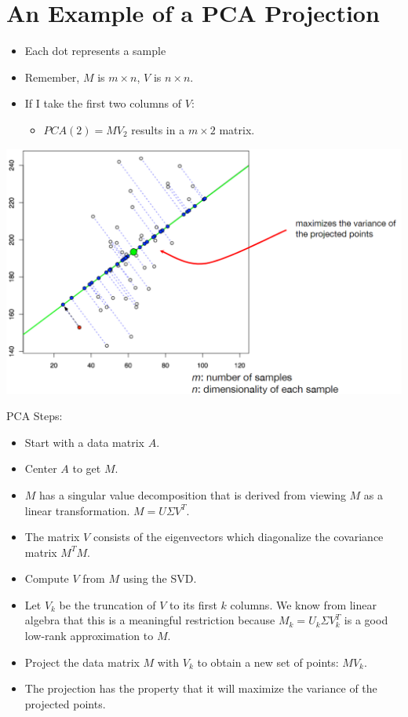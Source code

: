 \documentclass[10pt]{article}
\begin{document}
\section*{An Example of a PCA Projection}
\begin{itemize}
    \item Each dot represents a sample
    \item Remember, $M$ is $m \times n$, $V$ is $n \times n$.
    \item If I take the first two columns of $V$:
    \begin{itemize}
        \item $PCA(2) = MV_2$ results in a $m \times 2$ matrix.
    \end{itemize}
\end{itemize}
\begin{center}
    \includegraphics*[scale=0.65]{W8_2.png}
\end{center}
PCA Steps:
\begin{itemize}
    \item Start with a data matrix $A$.
    \item Center $A$ to get $M$.
    \item $M$ has a singular value decomposition that is derived from viewing $M$ as a linear transformation.  $M = U\Sigma V^T$.
    \item The matrix $V$ consists of the eigenvectors which diagonalize the covariance matrix $M^T M$.
    \item Compute $V$ from $M$ using the SVD.
    \item Let $V_k$ be the truncation of $V$ to its first $k$ columns.  We know from linear algebra that this is a meaningful restriction because $M_k = U_k \Sigma V_k^T$ is a good low-rank approximation to $M$.
    \item Project the data matrix $M$ with $V_k$ to obtain a new set of points: $MV_k$. 
    \item The projection has the property that it will maximize the variance of the projected points.
\end{itemize}
\end{document}
